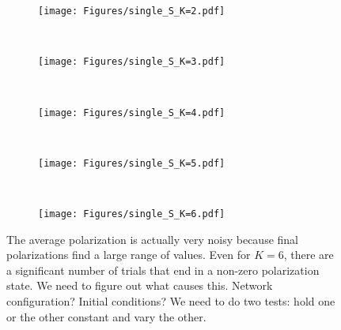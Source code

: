 \begin{figure}[h!]
  \centering
  \begin{subfigure}[t]{\textwidth}
    \centering
    \texttt{[image: Figures/single\_S\_K=2.pdf]}
  \end{subfigure} \\
  \begin{subfigure}[t]{0.49\textwidth}
      \centering
      \texttt{[image: Figures/single\_S\_K=3.pdf]}
  \end{subfigure}
  ~
  \begin{subfigure}[t]{0.49\textwidth}
      \centering
      \texttt{[image: Figures/single\_S\_K=4.pdf]}
  \end{subfigure} \\
  \begin{subfigure}[t]{0.49\textwidth}
      \centering
      \texttt{[image: Figures/single\_S\_K=5.pdf]}
  \end{subfigure}
  ~
  \begin{subfigure}[t]{0.49\textwidth}
      \centering
      \texttt{[image: Figures/single\_S\_K=6.pdf]}
  \end{subfigure}
  \caption{The average polarization is actually very noisy because 
    final polarizations find a large range of values. Even for $K=6$, there
    are a significant number of trials that end in a non-zero polarization
    state. We need to figure out what causes this. Network configuration?
    Initial conditions? We need to do two tests: hold one or the other 
    constant and vary the other.
  }
  \label{fig:single_S_K}
\end{figure}


